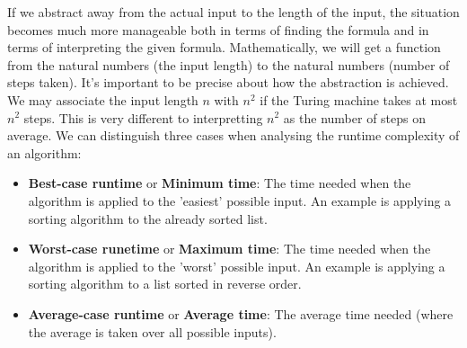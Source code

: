 \documentclass[11pt]{article}
\begin{document}
	\par If we abstract away from the actual input to the length of the input, the situation becomes much more manageable both in terms of finding the formula and in terms of interpreting the given formula. Mathematically, we will get a function from the natural numbers (the input length) to the natural numbers (number of steps taken). It's important to be precise about how the abstraction is achieved. We may associate the input length $n$ with $n^{2}$ if the Turing machine takes at most $n^{2}$ steps. This is very different to interpretting $n^{2}$ as the number of steps on average. We can distinguish three cases when analysing the runtime complexity of an algorithm:
	\begin{itemize}
		\item \textbf{Best-case runtime} or \textbf{Minimum time}: The time needed when the algorithm is applied to the 'easiest' possible input. An example is applying a sorting algorithm to the already sorted list.
		\item \textbf{Worst-case runetime} or \textbf{Maximum time}: The time needed when the algorithm is applied to the 'worst' possible input. An example is applying a sorting algorithm to a list sorted in reverse order.
		\item \textbf{Average-case runtime} or \textbf{Average time}: The average time needed (where the average is taken over all possible inputs).
	\end{itemize}
	
\end{document}
